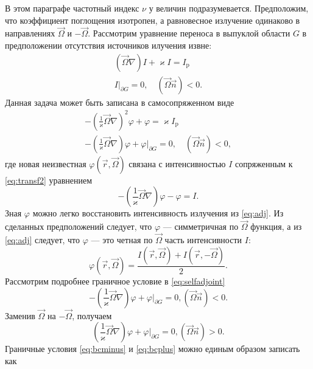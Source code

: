 В этом параграфе частотный индекс $\nu$ у величин подразумевается. Предположим, что коэффициент поглощения изотропен, а равновесное излучение одинаково в направлениях $\vec \Omega$ и $-\vec \Omega$.
Рассмотрим уравнение переноса в выпуклой области $G$ в предположении отсутствия источников илучения извне:
\begin{equation}
\begin{gathered}
(\vec \Omega \nabla) I + \varkappa I = I_\text{p}\\
I\big|_{\partial G} = 0, \quad (\vec \Omega \vec n) < 0.
\label{eq:transf2}
\end{gathered}
\end{equation}
Данная задача может быть записана в самосопряженном виде
\begin{equation}
\begin{gathered}
-\left(\frac{1}{\varkappa}\vec \Omega \nabla\right)^2 \varphi + \varphi = \varkappa I_\text{p}\\
-\left(\frac{1}{\varkappa}\vec \Omega \nabla\right)\varphi + \varphi \Big|_{\partial G} = 0, \quad (\vec \Omega \vec n) < 0,
\end{gathered}
\label{eq:selfadjoint} 
\end{equation}
где новая неизвестная $\varphi(\vec r, \vec \Omega)$ связана с интенсивностью $I$ сопряженным к \eqref{eq:transf2} уравнением
\begin{equation}
-\left(\frac{1}{\varkappa}\vec \Omega \nabla\right)\varphi - \varphi = I.
\label{eq:adj}
\end{equation}
Зная $\varphi$ можно легко восстановить интенсивность излучения из \eqref{eq:adj}. Из сделанных предположений следует, что $\varphi$ --- симметричная по $\vec \Omega$ функция, а из \eqref{eq:adj} следует, что $\varphi$ --- это четная по $\vec \Omega$ часть интенсивности $I$:
\[
\varphi(\vec r, \vec \Omega) = \frac{I(\vec r, \vec \Omega) + I(\vec r, -\vec \Omega)}{2}.
\]
Рассмотрим подробнее граничное условие в \eqref{eq:selfadjoint} 
\begin{equation}
-\left(\frac{1}{\varkappa}\vec \Omega\nabla\right)\varphi + \varphi\Big|_{\partial G} = 0, (\vec \Omega \vec n) < 0.
\label{eq:bcminus}
\end{equation}
Заменив $\vec \Omega$ на $-\vec \Omega$, получаем
\begin{equation}
\left(\frac{1}{\varkappa}\vec \Omega\nabla\right)\varphi + \varphi\Big|_{\partial G} = 0, (\vec \Omega \vec n) > 0.
\label{eq:bcplus}
\end{equation}
Граничные условия \eqref{eq:bcminus} и \eqref{eq:bcplus} можно единым образом записать как
